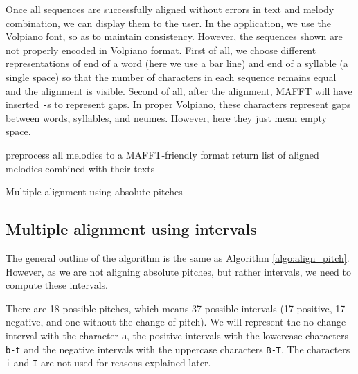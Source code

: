 Once all sequences are successfully aligned without errors in text and melody combination, we can display them to the user. In the application, we use the Volpiano font,
so as to maintain consistency. However, the sequences shown are not properly encoded in Volpiano format. First of all, we choose different representations of end of a word
(here we use a bar line) and end of a syllable (a single space) so that the number of characters in each sequence remains equal and the alignment is visible. Second of all,
after the alignment, MAFFT will have inserted \verb|-|s to represent gaps. In proper Volpiano, these characters represent gaps between words, syllables, and neumes. However,
here they just mean empty space.\newline

\begin{algorithm}[H]
    \BlankLine
    preprocess all melodies to a MAFFT-friendly format\;
    return list of aligned melodies combined with their texts\;
    \caption{Multiple alignment using absolute pitches}
    \label{algo:align_pitch}
\end{algorithm}

\subsection{Multiple alignment using intervals}

The general outline of the algorithm is the same as Algorithm \ref{algo:align_pitch}. However, as we are not aligning absolute pitches, but rather intervals,
we need to compute these intervals.

There are 18 possible pitches, which means 37 possible intervals (17 positive, 17 negative, and one without the change of pitch). We will represent the no-change interval
with the character \verb|a|, the positive intervals with the lowercase characters \verb|b-t| and the negative intervals with the uppercase characters \verb|B-T|. The characters
\verb|i| and \verb|I| are not used for reasons explained later.

